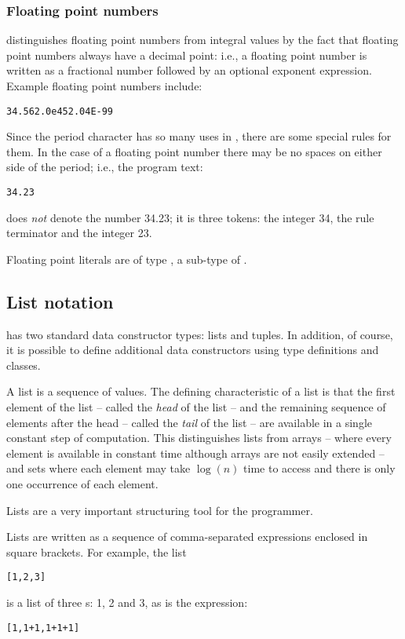 \subsubsection{Floating point numbers}
\go distinguishes floating point numbers from integral values by the fact that floating point numbers always have a decimal point: i.e., a floating point number is written as a fractional number followed by an optional exponent expression. Example floating point numbers include:
\begin{alltt}
34.56 2.0e45 2.04E-99
\end{alltt}
Since the period character has so many uses in \go, there are some special rules for them. In the case of a floating point number there may be no spaces on either side of the period; i.e., the program text:
\begin{alltt}
34 . 23
\end{alltt}
does \emph{not} denote the number 34.23; it is three tokens: the integer 34, the rule terminator \q{\dotspace} and the integer 23.

Floating point literals are of type , a sub-type of .

\subsection{List notation}
\label{expression:lists}

\go has two standard data constructor types: lists and tuples. In addition, of course, it is possible to define additional data constructors using type definitions and classes.

A list is a sequence of values. The defining characteristic of a list is that the first element of the list -- called  the \emph{head} of the list -- and the remaining sequence of elements after the head -- called the \emph{tail} of the list -- are available in a single constant step of computation. This distinguishes lists from arrays -- where every element is available in constant time although arrays are not easily extended -- and sets where each element may take $\log{}(n)$ time to access and there is only one occurrence of each element.

Lists are a very important structuring tool for the \go programmer.

Lists are written as a sequence of comma-separated expressions enclosed in square brackets. For example, the list
\begin{alltt}
[1,2,3]
\end{alltt}
is a list of three s: 1, 2 and 3, as is the expression:
\begin{alltt}
[1,1+1,1+1+1]
\end{alltt}


